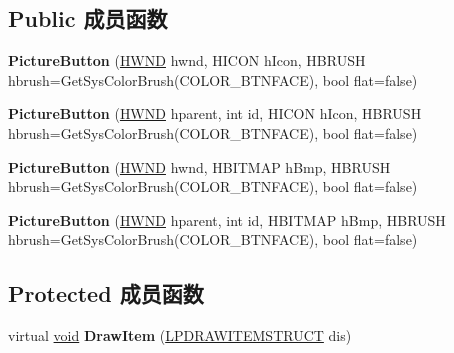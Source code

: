 \subsection*{Public 成员函数}
\begin{DoxyCompactItemize}
\item 
\mbox{\label{struct_picture_button_a0dd177b06e4d7fa8de8fb66de562a846}} 
{\bfseries Picture\+Button} (\hyperlink{interfacevoid}{H\+W\+ND} hwnd, H\+I\+C\+ON h\+Icon, H\+B\+R\+U\+SH hbrush=Get\+Sys\+Color\+Brush(C\+O\+L\+O\+R\+\_\+\+B\+T\+N\+F\+A\+CE), bool flat=false)
\item 
\mbox{\label{struct_picture_button_a83de91b74e668182158e5f74d641b40b}} 
{\bfseries Picture\+Button} (\hyperlink{interfacevoid}{H\+W\+ND} hparent, int id, H\+I\+C\+ON h\+Icon, H\+B\+R\+U\+SH hbrush=Get\+Sys\+Color\+Brush(C\+O\+L\+O\+R\+\_\+\+B\+T\+N\+F\+A\+CE), bool flat=false)
\item 
\mbox{\label{struct_picture_button_a52768f352b14cc7c064e5edd769152ac}} 
{\bfseries Picture\+Button} (\hyperlink{interfacevoid}{H\+W\+ND} hwnd, H\+B\+I\+T\+M\+AP h\+Bmp, H\+B\+R\+U\+SH hbrush=Get\+Sys\+Color\+Brush(C\+O\+L\+O\+R\+\_\+\+B\+T\+N\+F\+A\+CE), bool flat=false)
\item 
\mbox{\label{struct_picture_button_a76837f3a69ea569eef7ce6386edb2da2}} 
{\bfseries Picture\+Button} (\hyperlink{interfacevoid}{H\+W\+ND} hparent, int id, H\+B\+I\+T\+M\+AP h\+Bmp, H\+B\+R\+U\+SH hbrush=Get\+Sys\+Color\+Brush(C\+O\+L\+O\+R\+\_\+\+B\+T\+N\+F\+A\+CE), bool flat=false)
\end{DoxyCompactItemize}
\subsection*{Protected 成员函数}
\begin{DoxyCompactItemize}
\item 
\mbox{\label{struct_picture_button_a998054d3abdb1ad75a8c803b4e2b5756}} 
virtual \hyperlink{interfacevoid}{void} {\bfseries Draw\+Item} (\hyperlink{structtag_d_r_a_w_i_t_e_m_s_t_r_u_c_t}{L\+P\+D\+R\+A\+W\+I\+T\+E\+M\+S\+T\+R\+U\+CT} dis)
\end{DoxyCompactItemize}
